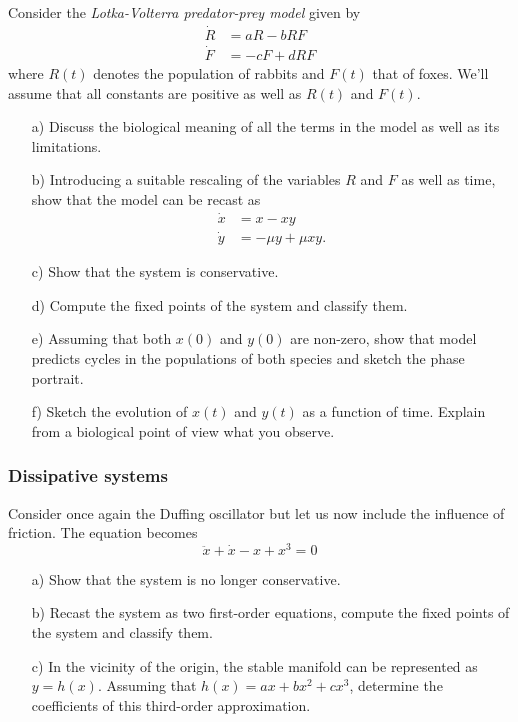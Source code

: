\begin{problem}
  Consider the \emph{Lotka-Volterra predator-prey model} given by
  \[
  \begin{aligned}
    \dot{R} & = a R - b RF \\
    \dot{F} & = -c F + d RF
  \end{aligned}
  \]
  where $R(t)$ denotes the population of rabbits and $F(t)$ that of foxes.
  We'll assume that all constants are positive as well as $R(t)$ and $F(t)$.

  \begin{enumerate}
  \item[a)] Discuss the biological meaning of all the terms in the model as well as its limitations.

  \item[b)] Introducing a suitable rescaling of the variables $R$ and $F$ as well as time, show that the model can be recast as
    \[
    \begin{aligned}
      \dot{x} & = x - xy \\
      \dot{y} & = - \mu y + \mu xy.
    \end{aligned}
    \]

  \item[c)] Show that the system is conservative.

  \item[d)] Compute the fixed points of the system and classify them.

  \item[e)] Assuming that both $x(0)$ and $y(0)$ are non-zero, show that model predicts cycles in the populations of both species and sketch the phase portrait.

  \item[f)] Sketch the evolution of $x(t)$ and $y(t)$ as a function of time.
    Explain from a biological point of view what you observe.
  \end{enumerate}
\end{problem}

\subsubsection*{Dissipative systems}

\begin{problem}
  Consider once again the Duffing oscillator but let us now include the influence of friction.
  The equation becomes
  \[
  \ddot{x} + \dot{x} - x + x^3 = 0
  \]

  \begin{enumerate}
  \item[a)] Show that the system is no longer conservative.

  \item[b)] Recast the system as two first-order equations, compute the fixed points of the system and classify them.

  \item[c)] In the vicinity of the origin, the stable manifold can be represented as $y = h(x)$.
    Assuming that $h(x) = a x + b x^2 + c x^3$, determine the coefficients of this third-order approximation.
  \end{enumerate}
\end{problem}

